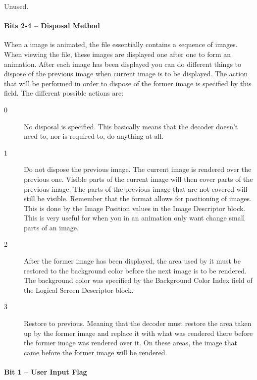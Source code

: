 Unused.

\paragraph{Bits 2-4 -- Disposal Method}

When a \gif image is animated, the file essentially contains a sequence
of images. When viewing the \gif file, these images are displayed one
after one to form an animation. After each image has been displayed
you can do different things to dispose of the previous image when
current image is to be displayed. The action that will be performed in
order to dispose of the former image is specified by this field. The
different possible actions are:

\begin{description}

\item[0] No disposal is specified. This basically means that the
  decoder doesn't need to, nor is required to, do anything at all.

\item[1] Do not dispose the previous image. The current image is
  rendered over the previous one. Visible parts of the current image
  will then cover parts of the previous image. The parts of the
  previous image that are not covered will still be visible. Remember
  that the \gif format allows for positioning of images. This is done
  by the Image Position values in the Image Descriptor block. This is
  very useful for when you in an animation only want change small
  parts of an image.

\item[2] After the former image has been displayed, the area used by
  it must be restored to the background color before the next image is
  to be rendered. The background color was specified by the Background
  Color Index field of the Logical Screen Descriptor block.

\item[3] Restore to previous. Meaning that the decoder must restore
  the area taken up by the former image and replace it with what was
  rendered there before the former image was rendered over it. On
  these areas, the image that came before the former image will be
  rendered.


\end{description}

\paragraph{Bit 1  -- User Input Flag}

